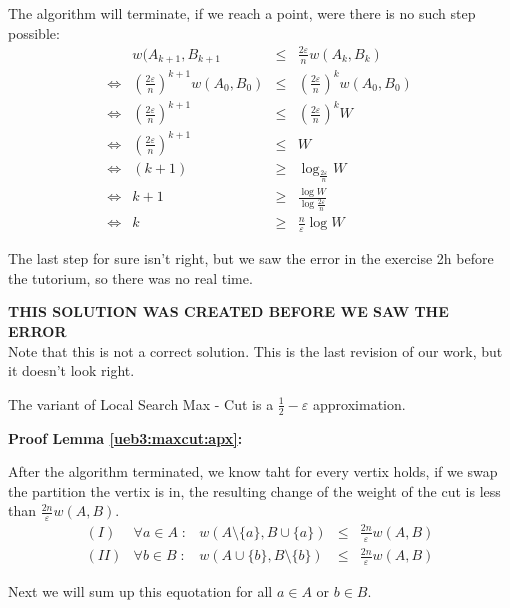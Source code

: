 The algorithm will terminate, if we reach a point, were there is no such step possible:
$$\begin{array}{crcl}
& w(A_{k+1},B_{k+1} & \leq & \frac{2\varepsilon}{n} w(A_k,B_k)\\
\Leftrightarrow & (\frac{2\varepsilon}{n} )^{k+1} w(A_0,B_0) &\leq & (\frac{2\varepsilon}{n})^k w(A_0,B_0)\\
\Leftrightarrow & \left( \frac{2\varepsilon}{n}\right)^{k+1} & \leq & \left( \frac{2\varepsilon}{n}\right)^k W\\
\Leftrightarrow & \left( \frac{2\varepsilon}{n} \right)^{k+1} & \leq & W\\
\Leftrightarrow & (k+1) &\geq& \log_{\frac{2\varepsilon}{n}} W\\
\Leftrightarrow & k+1 & \geq & \frac{\log W}{\log \frac{2\varepsilon}{n}}\\
\Leftrightarrow & k & \geq & \frac{n}{\varepsilon} \log W
\end{array}$$

The last step for sure isn't right, but we saw the error in the exercise 2h before the tutorium, so there was no real time.

\textbf{THIS SOLUTION WAS CREATED BEFORE WE SAW THE ERROR}\\
Note that this is not a correct solution. This is the last revision of our work, but it doesn't look right.\\

\begin{lemma}\label{ueb3:maxcut:apx}
{\mdseries
The variant of Local Search Max - Cut is a $\frac{1}{2} - \varepsilon$ approximation.
}
\end{lemma}
\textbf{Proof Lemma \ref{ueb3:maxcut:apx}:}

After the algorithm terminated, we know taht for every vertix holds, if we swap the partition the vertix is in, the resulting change of the weight of the cut is less than $\frac{2n}{\varepsilon}w(A,B)$.\\

$$\begin{array}{ccrcl}
(I) & \forall a \in A \; : & w(A\setminus\{a\}, B \cup \{a\}) & \leq & \frac{2n}{\varepsilon}w(A,B)\\
(II) & \forall b \in B \; : & w(A \cup \{b\} , B \setminus \{b\}) & \leq & \frac{2n}{\varepsilon}w(A,B)
\end{array}$$

Next we will sum up this equotation for all $a \in A$ or $b \in B$.\\

